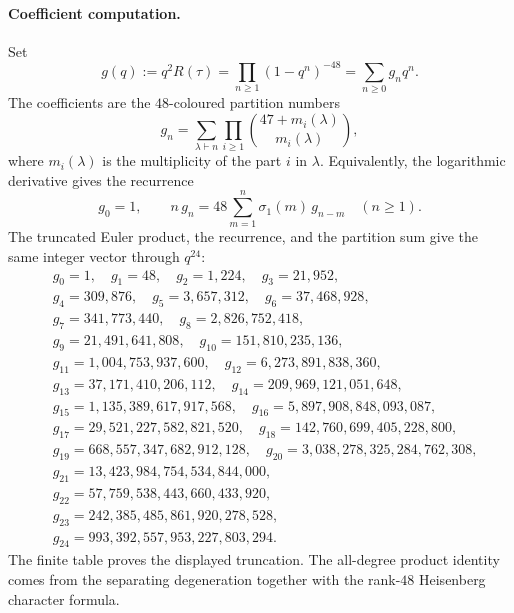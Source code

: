 \paragraph{Coefficient computation.}
Set
\[
  g(q):=q^2R(\tau)=\prod_{n\geq1}(1-q^n)^{-48}
       =\sum_{n\geq0}g_nq^n.
\]
The coefficients are the $48$-coloured partition numbers
\[
  g_n=\sum_{\lambda\vdash n}\prod_{i\geq1}
       \binom{47+m_i(\lambda)}{m_i(\lambda)},
\]
where $m_i(\lambda)$ is the multiplicity of the part $i$ in
$\lambda$. Equivalently, the logarithmic derivative gives the recurrence
\[
  g_0=1,\qquad
  n\,g_n =48\sum_{m=1}^{n}\sigma_1(m)\,g_{n-m}
  \quad (n\geq1).
\]
The truncated Euler product, the recurrence, and the partition sum give
the same integer vector through \(q^{24}\):
{\small
\begin{align*}
  &g_0 = 1,\quad g_1 = 48,\quad g_2 = 1{,}224,\quad g_3 = 21{,}952,\\
  &g_4 = 309{,}876,\quad g_5 = 3{,}657{,}312,\quad
    g_6 = 37{,}468{,}928,\\
  &g_7 = 341{,}773{,}440,\quad
    g_8 = 2{,}826{,}752{,}418,\\
  &g_9 = 21{,}491{,}641{,}808,\quad
    g_{10} = 151{,}810{,}235{,}136,\\
  &g_{11} = 1{,}004{,}753{,}937{,}600,\quad
    g_{12} = 6{,}273{,}891{,}838{,}360,\\
  &g_{13} = 37{,}171{,}410{,}206{,}112,\quad
    g_{14} = 209{,}969{,}121{,}051{,}648,\\
  &g_{15} = 1{,}135{,}389{,}617{,}917{,}568,\quad
    g_{16} = 5{,}897{,}908{,}848{,}093{,}087,\\
  &g_{17} = 29{,}521{,}227{,}582{,}821{,}520,\quad
    g_{18} = 142{,}760{,}699{,}405{,}228{,}800,\\
  &g_{19} = 668{,}557{,}347{,}682{,}912{,}128,\quad
    g_{20} = 3{,}038{,}278{,}325{,}284{,}762{,}308,\\
  &g_{21} = 13{,}423{,}984{,}754{,}534{,}844{,}000,\\
  &g_{22} = 57{,}759{,}538{,}443{,}660{,}433{,}920,\\
  &g_{23} = 242{,}385{,}485{,}861{,}920{,}278{,}528,\\
  &g_{24} = 993{,}392{,}557{,}953{,}227{,}803{,}294.
\end{align*}%
}
The finite table proves the displayed truncation. The all-degree product
identity comes from the separating degeneration together with the
rank-\(48\) Heisenberg character formula.

